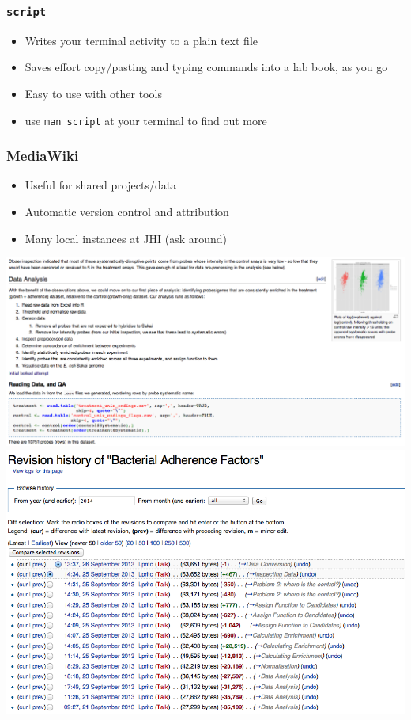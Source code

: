 \documentclass[table]{beamer}
\begin{document}
   \begin{frame}
     \frametitle{\texttt{script}}
     \begin{itemize}
       \item Writes your terminal activity to a plain text file
       \item Saves effort copy/pasting and typing commands into a lab book, as you go
       \item Easy to use with other tools 
       \item use \texttt{man script} at your terminal to find out more
     \end{itemize}
   \end{frame}   
   
   \begin{frame}
     \frametitle{MediaWiki}
     \begin{itemize}
       \item Useful for shared projects/data
       \item Automatic version control and attribution
       \item Many local instances at JHI (ask around)
     \end{itemize}
    \includegraphics[width=.4\textwidth]{images/mediawiki_after}
	\includegraphics[width=.4\textwidth]{images/mediawiki_version_control}     
   \end{frame}
   
\end{document}
